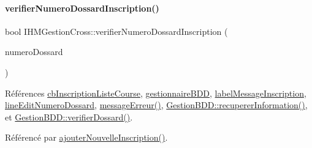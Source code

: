 \paragraph{\texorpdfstring{verifier\+Numero\+Dossard\+Inscription()}{verifierNumeroDossardInscription()}}
{\footnotesize\ttfamily bool I\+H\+M\+Gestion\+Cross\+::verifier\+Numero\+Dossard\+Inscription (\begin{DoxyParamCaption}\item[{Q\+String}]{numero\+Dossard }\end{DoxyParamCaption})\hspace{0.3cm}{\ttfamily [private]}}



Références \hyperlink{class_i_h_m_gestion_cross_aff44e6f1a225ee5b55783afe72049f83}{cb\+Inscription\+Liste\+Course}, \hyperlink{class_i_h_m_gestion_cross_a440bac63a3e51db3e2c08e883f8cafc9}{gestionnaire\+B\+DD}, \hyperlink{class_i_h_m_gestion_cross_a1855bd63290c39c20660064b41710e8c}{label\+Message\+Inscription}, \hyperlink{class_i_h_m_gestion_cross_adeb4cfc9a218c06fca5cabc280a611e2}{line\+Edit\+Numero\+Dossard}, \hyperlink{class_i_h_m_gestion_cross_a92fa6016b00d2d4429c901e77d37bf10}{message\+Erreur()}, \hyperlink{class_gestion_b_d_d_a0a2fa02b90974684658937fbfb55bf0a}{Gestion\+B\+D\+D\+::recuperer\+Information()}, et \hyperlink{class_gestion_b_d_d_a1a39bbc7bfcb60d286363b9d2dd7f88b}{Gestion\+B\+D\+D\+::verifier\+Dossard()}.



Référencé par \hyperlink{class_i_h_m_gestion_cross_af0165d32344af78b4edce59f88c90ff6}{ajouter\+Nouvelle\+Inscription()}.


